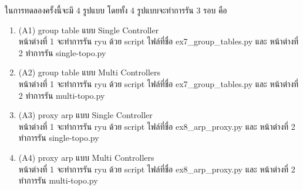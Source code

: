 ในการทดลองครั้งนี้จะมี 4 รูปแบบ โดยทั้ง 4 รูปแบบจะทำการรัน 3 รอบ คือ 

\begin{enumerate}
    \item (A1) group table แบบ Single Controller \\
    หน้าต่างที่ 1 จะทำการรัน ryu ด้วย script ไฟล์ที่ชื่อ ex7\_group\_tables.py 
    และ หน้าต่างที่ 2 ทำการรัน single-topo.py
    \item (A2) group table แบบ Multi Controllers \\
    หน้าต่างที่ 1 จะทำการรัน ryu ด้วย script ไฟล์ที่ชื่อ ex7\_group\_tables.py
    และ หน้าต่างที่ 2 ทำการรัน multi-topo.py
    \item (A3) proxy arp แบบ Single Controller \\
    หน้าต่างที่ 1 จะทำการรัน ryu ด้วย script ไฟล์ที่ชื่อ ex8\_arp\_proxy.py
    และ หน้าต่างที่ 2 ทำการรัน single-topo.py
    \item (A4) proxy arp แบบ Multi Controllers \\
    หน้าต่างที่ 1 จะทำการรัน ryu ด้วย script ไฟล์ที่ชื่อ ex8\_arp\_proxy.py
    และ หน้าต่างที่ 2 ทำการรัน multi-topo.py
 
\end{enumerate}

